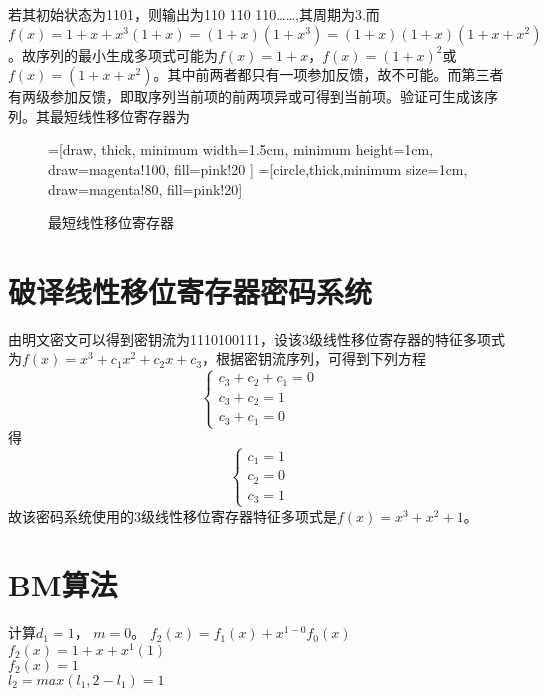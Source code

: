 \documentclass{article}
\begin{document}
若其初始状态为1101，则输出为110 110 110……,其周期为3.而$f(x)=1+x + x^3(1+x) = (1+x)(1+x^3)=(1+x)(1+x)(1+x+x^2)$。故序列的最小生成多项式可能为$f(x)=1+x$，$f(x)=(1+x)^2$或$f(x)=(1+x+x^2)$。其中前两者都只有一项参加反馈，故不可能。而第三者有两级参加反馈，即取序列当前项的前两项异或可得到当前项。验证可生成该序列。其最短线性移位寄存器为
\begin{figure}[htbp]
\centering
	=[draw, thick, minimum width=1.5cm, minimum height=1cm, 
                                    draw=magenta!100,
                                    fill=pink!20
                                    ]
    =[circle,thick,minimum size=1cm,
                                    draw=magenta!80,
                                    fill=pink!20]

\caption{最短线性移位寄存器}
\end{figure}

\section*{破译线性移位寄存器密码系统}
由明文密文可以得到密钥流为1110100111，设该3级线性移位寄存器的特征多项式为$f(x)=x^3+c_1x^2+c_2x+c_3$，根据密钥流序列，可得到下列方程
$$\begin{cases}
	c_3+c_2+c_1=0\\
	c_3+c_2=1\\
	c_3+c_1=0
\end{cases}
$$
得
$$
\begin{cases}
	c_1=1\\
	c_2=0\\
	c_3=1
\end{cases}
$$
故该密码系统使用的3级线性移位寄存器特征多项式是$f(x)=x^3+x^2+1$。
\section*{BM算法}
计算$d_{1}={1}$，
$m=0$。
$f_{2}(x) = f_{1}(x) + x^{1-0}f_{0}(x)$\\
$f_{2}(x) = 1 + x  + x^{1}(1 )$\\
$f_{2}(x) = 1 $\\
$l_{2}=max(l_{1}, 2-l_{1})=1$
\end{document}
